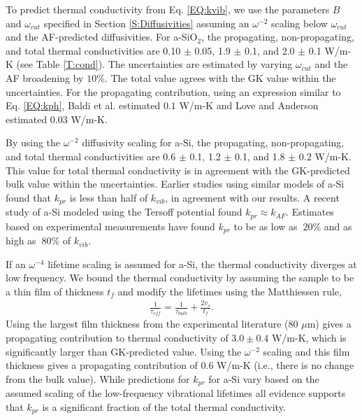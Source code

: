 \documentclass[aps,prb,onecolumn,preprint,superscriptaddress,footinbib,amsmath,amssymb,floatfix]{revtex4}
\begin{document}
To predict thermal conductivity from Eq. \eqref{EQ:kvib}, 
we use the parameters $B$ and $\omega_{cut}$ specified 
in Section \ref{S:Diffusivities} assuming an $\omega^{-2}$ 
scaling below $\omega_{cut}$ and the AF-predicted diffusivities. 
For a-SiO$_2$, the propagating, non-propagating, and total thermal 
conductivities are 0.10 $\pm$ 0.05, 1.9 $\pm$ 0.1, 
and 2.0 $\pm$ 0.1 W/m-K (see Table \ref{T:cond}). The uncertainties 
are estimated by varying $\omega_{cut}$ and the AF 
broadening by $10\%$.  
The total value agrees with the GK value within the uncertainties. 
For the propagating contribution, 
using an expression similar to Eq. \eqref{EQ:kph}, 
Baldi et al.\cite{baldi_thermal_2008} estimated $0.1$ W/m-K and 
Love and Anderson\cite{love_estimate_1990} estimated 0.03 W/m-K.

By using the $\omega^{-2}$ diffusivity scaling for a-Si, 
the propagating, non-propagating, and total thermal conductivities 
are 0.6 $\pm$ 0.1, 1.2 $\pm$ 0.1, and 1.8 $\pm$ 0.2 W/m-K. 
This value for total thermal conductivity 
is in agreement with the GK-predicted bulk value within the 
uncertainties. Earlier studies using 
similar models of a-Si found 
that $k_{pr}$ is less than half of 
$k_{vib}$,\cite{feldman_thermal_1993,
feldman_numerical_1999} in agreement with our results.  
A recent study of a-Si modeled using the Tersoff potential found 
$k_{pr} \approx k_{AF}$.\cite{he_heat_2011} 
Estimates based on experimental measurements 
have found $k_{pr}$ to be as low 
as $~20\%$\cite{cahill_thermal_1994,feldman_numerical_1999} 
and as high as $~80\%$ of $k_{vib}$.
\cite{liu_high_2009,yang_anomalously_2010}

If an $\omega^{-4}$ lifetime scaling is assumed for a-Si, 
the thermal conductivity diverges at low frequency. We bound the 
thermal conductivity by assuming the sample to be a thin film 
of thickness $t_f$ and modify the lifetimes using the Matthiessen 
rule,\cite{ziman_electrons_2001} 
\begin{equation}\label{EQ:LambdaMatth}
\begin{split}
\frac{1}{\tau_{eff}} = \frac{1}{\tau_{bulk}} + 
\frac{2v_s}{t_f}.
\end{split}
\end{equation}
Using the largest film thickness from the experimental 
literature ($80$ $\mu$m)\cite{liu_high_2009} 
gives a propagating contribution 
to thermal conductivity of $3.0 \pm 0.4$ W/m-K, which is 
significantly larger than GK-predicted value. 
Using the $\omega^{-2}$ scaling and this film thickness 
gives a propagating contribution of 0.6 W/m-K (i.e., there is 
no change from the bulk value). 
While predictions for $k_{pr}$ for a-Si  
vary based on the assumed scaling of the low-frequency 
vibrational lifetimes 
all evidence supports that $k_{pr}$ is a significant fraction 
of the total thermal conductivity.
\cite{feldman_thermal_1993,cahill_thermal_1994,
feldman_numerical_1999,liu_high_2009,
yang_anomalously_2010,
he_heat_2011,regner_broadband_2013}
\end{document}
